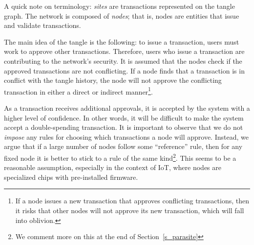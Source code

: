 \documentclass[12pt]{article}
\begin{document}
A quick note on terminology: \emph{sites} are transactions
represented on the tangle graph. The network 
is composed
of \emph{nodes}; that is, nodes are entities that
issue and validate transactions. 

The main idea of the tangle is the following: 
to issue a transaction, users must work to
approve other transactions. Therefore, users who
issue a transaction are contributing 
to the network's security.
It is assumed that the nodes check if the approved transactions
are not conflicting. If a node finds that a transaction is in conflict with 
the tangle history, the node 
will not approve the conflicting transaction in either a direct or indirect 
manner\footnote{If 
a node issues a new transaction that approves conflicting transactions,
 then it risks that other nodes
will not approve its new transaction, 
which will fall into oblivion.}. 

As a transaction 
receives additional 
approvals, it is accepted by the system with a higher level of confidence.
In other words, 
it will be 
difficult 
to make the system 
accept a double-spending transaction.
It is important to observe that we do not \emph{impose}
any rules for choosing which transactions a node will approve.
Instead, we argue that if a large number of 
nodes follow some ``reference'' rule,
then for any fixed node it is better to stick to a rule
of the same kind\footnote{We comment more on this at the 
end of Section~\ref{s_parasite}}.
This seems to be a reasonable assumption, especially 
in the context of IoT, where nodes are specialized 
chips with pre-installed firmware.
\end{document}
